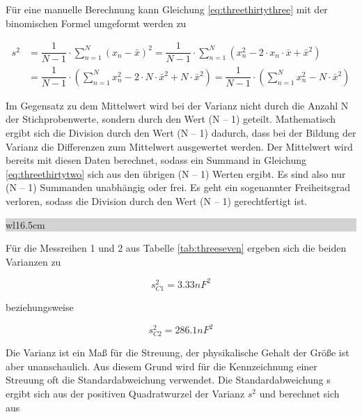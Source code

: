 \noindent F\"{u}r eine manuelle Berechnung kann Gleichung \eqref{eq:threethirtythree} mit der binomischen Formel umgeformt werden zu

\begin{equation}\label{eq:threethirtyfour}
\begin{split}
s^{2}  & = \dfrac{1}{N-1} \cdot \sum _{n=1}^{N}(x_{n} -\bar{x})^{2}  =\dfrac{1}{N-1} \cdot \sum _{n=1}^{N}(x_{n}^{2} -2\cdot x_{n} \cdot \bar{x}+\bar{x}^{2} ) \\ 
& = \dfrac{1}{N-1} \cdot \left(\sum _{n=1}^{N} x^{2}_{n} - 2\cdot N \cdot \bar{x}^{2} + N\cdot \bar{x}^{2} \right) =  \dfrac{1}{N-1} \cdot  \left(\sum _{n=1}^{N} x^{2}_{n} -   N\cdot \bar{x}^{2} \right)
\end{split}
\end{equation}

\noindent Im Gegensatz zu dem Mittelwert wird bei der Varianz nicht durch die Anzahl N der Stichprobenwerte, sondern durch den Wert (N -- 1) geteilt. Mathematisch ergibt sich die Division durch den Wert (N -- 1) dadurch, dass bei der Bildung der Varianz die Differenzen zum Mittelwert ausgewertet werden. Der Mittelwert wird bereits mit diesen Daten berechnet, sodass ein Summand in Gleichung \eqref{eq:threethirtytwo} sich aus den \"{u}brigen (N -- 1) Werten ergibt. Es sind also nur (N -- 1) Summanden unabh\"{a}ngig oder frei. Es geht ein sogenannter Freiheitsgrad verloren, sodass die Division durch den Wert (N -- 1) gerechtfertigt ist. \bigskip

\noindent
\colorbox{lightgray}{%
%
\renewcommand\arraystretch{0.6}%
\begin{tabular}{ wl{16.5cm} }
{\selectfont
{}}
\end{tabular}%
}\bigskip

\noindent F\"{u}r die Messreihen 1 und 2 aus Tabelle \ref{tab:threeseven} ergeben sich die beiden Varianzen zu 

\begin{equation}\label{eq:threethirtyfive}
s_{C1}^{2} = 3.33 n{F}^{2}
\end{equation}

\noindent beziehungsweise 

\begin{equation}\label{eq:threethirtysix}
s_{C2}^{2} = 286.1 n{F}^{2}
\end{equation}

\noindent Die Varianz ist ein Ma{\ss} f\"{u}r die Streuung, der physikalische Gehalt der Gr\"{o}{\ss}e ist aber unanschaulich. Aus diesem Grund wird f\"{u}r die Kennzeichnung einer Streuung oft die Standardabweichung verwendet. Die Standardabweichung s ergibt sich aus der positiven Quadratwurzel der Varianz $s^{2}$ und berechnet sich aus 

